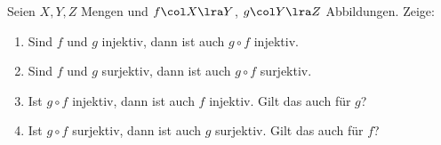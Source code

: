 \begin{aufg}

  Seien $X,Y,Z$ Mengen und $f\col X\lra Y$, $g\col Y\lra Z$ Abbildungen. Zeige:
  \begin{enumerate}
    \item Sind $f$ und $g$ injektiv, dann ist auch $g\circ f$ injektiv.
    \item Sind $f$ und $g$ surjektiv, dann ist auch $g\circ f$ surjektiv.
    \item Ist $g\circ f$ injektiv, dann ist auch $f$ injektiv. Gilt das
      auch für $g$?
    \item Ist $g\circ f$ surjektiv, dann ist auch $g$ surjektiv. Gilt das
      auch für $f$?
  \end{enumerate}
  
\end{aufg}
